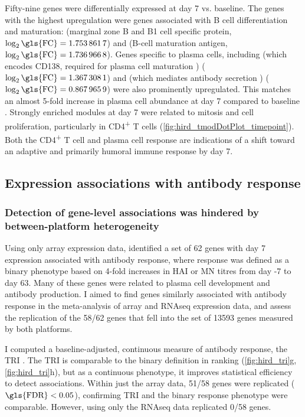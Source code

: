 Fifty-nine genes were differentially expressed at day 7 vs. baseline.
The genes with the highest upregulation were genes associated with B cell differentiation and maturation:  (marginal zone B and B1 cell specific protein, $\log_2\text{\gls{FC}} = \num{1.7538617}$) and  (B-cell maturation antigen, $\log_2\text{\gls{FC}} = \num{1.7369668}$).
Genes specific to plasma cells, including  (which encodes CD138, required for plasma cell maturation \autocite{mccarron2017CD138MediatesSelection}) ($\log_2\text{\gls{FC}} = \num{1.3673081}$) and  (which mediates antibody secretion \autocite{martincic2009TranscriptionElongationFactor}) ($\log_2\text{\gls{FC}} = \num{0.8679659}$) were also prominently upregulated.
This matches an almost 5-fold increase in plasma cell abundance at day 7 compared to baseline \autocite{sobolev2016AdjuvantedInfluenzaH1N1Vaccination}.
Strongly enriched modules at day 7 were related to mitosis and cell proliferation, particularly in CD4\textsuperscript{+} T cells (\cref{fig:hird_tmodDotPlot_timepoint}).
Both the CD4\textsuperscript{+} T cell and plasma cell response are indications of a shift toward an adaptive and primarily humoral immune response by day 7.

\subsection{Expression associations with antibody response}

\subsubsection{Detection of gene-level associations was hindered by between-platform heterogeneity}

Using only array expression data, \textcite{sobolev2016AdjuvantedInfluenzaH1N1Vaccination} identified a set of 62 genes with day 7 expression associated with antibody response, 
where response was defined as a binary phenotype based on 4-fold increases in \gls{HAI} or \gls{MN} titres from day -7 to day 63.
Many of these genes were related to plasma cell development and antibody production.
I aimed to find genes similarly associated with antibody response in the meta-analysis of array and \gls{RNAseq} expression data,
and assess the replication of the 58/62 genes that fell into the set of \num{13593} genes measured by both platforms.

I computed a baseline-adjusted, continuous measure of antibody response, the \gls{TRI} \autocite{bucasas2011EarlyPatternsGene}.
The \gls{TRI} is comparable to the binary definition in ranking (\cref{fig:hird_tri}g, \cref{fig:hird_tri}h), but as a continuous phenotype, it improves statistical efficiency to detect associations.
Within just the array data, 51/58 genes were replicated ($\text{\gls{FDR}} < 0.05$), 
confirming \gls{TRI} and the binary response phenotype were comparable.
However, using only the \gls{RNAseq} data replicated 0/58 genes.

